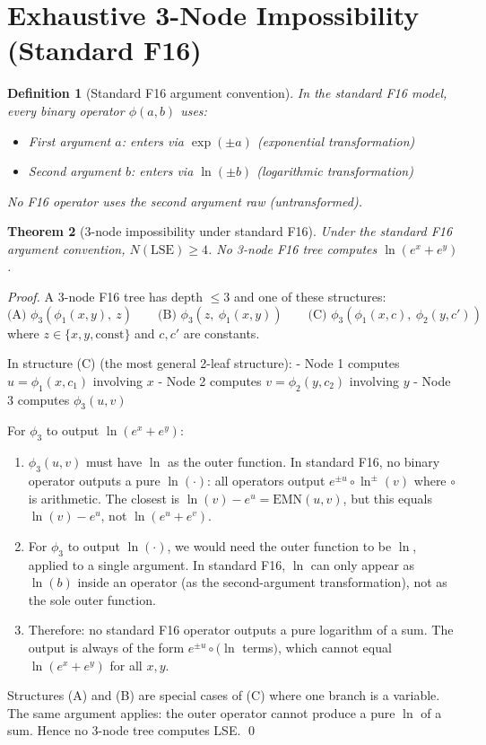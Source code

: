 \documentclass[11pt]{article}
\newtheorem{theorem}{Theorem}
\newtheorem{definition}[theorem]{Definition}
\begin{document}
\section{Exhaustive 3-Node Impossibility (Standard F16)}

\begin{definition}[Standard F16 argument convention]
In the standard F16 model, every binary operator $\phi(a,b)$ uses:
\begin{itemize}
  \item First argument $a$: enters via $\exp(\pm a)$ (exponential transformation)
  \item Second argument $b$: enters via $\ln(\pm b)$ (logarithmic transformation)
\end{itemize}
No F16 operator uses the second argument \emph{raw} (untransformed).
\end{definition}

\begin{theorem}[3-node impossibility under standard F16]
\label{thm:lb3}
Under the standard F16 argument convention, $N(\mathrm{LSE}) \geq 4$.
No 3-node F16 tree computes $\ln(e^x + e^y)$.
\end{theorem}

\begin{proof}
A 3-node F16 tree has depth $\leq 3$ and one of these structures:
\[
\text{(A) } \phi_3(\phi_1(x,y),\ z) \qquad
\text{(B) } \phi_3(z,\ \phi_1(x,y)) \qquad
\text{(C) } \phi_3(\phi_1(x,c),\ \phi_2(y,c'))
\]
where $z \in \{x, y, \text{const}\}$ and $c, c'$ are constants.

In structure (C) (the most general 2-leaf structure):
- Node 1 computes $u = \phi_1(x, c_1)$ involving $x$
- Node 2 computes $v = \phi_2(y, c_2)$ involving $y$
- Node 3 computes $\phi_3(u, v)$

For $\phi_3$ to output $\ln(e^x + e^y)$:
\begin{enumerate}
  \item $\phi_3(u,v)$ must have $\ln$ as the outer function. In standard F16,
    no binary operator outputs a pure $\ln(\cdot)$: all operators output
    $e^{\pm u} \circ \ln^{\pm}(v)$ where $\circ$ is arithmetic.
    The closest is $\ln(v) - e^u = \mathrm{EMN}(u,v)$, but this equals
    $\ln(v) - e^u$, not $\ln(e^u + e^v)$.

  \item For $\phi_3$ to output $\ln(\cdot)$, we would need the outer function to be $\ln$,
    applied to a single argument. In standard F16, $\ln$ can only appear as
    $\ln(b)$ inside an operator (as the second-argument transformation),
    not as the sole outer function.

  \item Therefore: no standard F16 operator outputs a pure logarithm of
    a sum. The output is always of the form $e^{\pm u} \circ (\ln$ terms$)$,
    which cannot equal $\ln(e^x + e^y)$ for all $x, y$.
\end{enumerate}

Structures (A) and (B) are special cases of (C) where one branch is a variable.
The same argument applies: the outer operator cannot produce a pure $\ln$ of a sum.
Hence no 3-node tree computes LSE. \qed
\end{proof}
\end{document}
